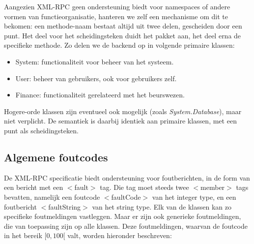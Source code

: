 Aangezien XML-RPC geen ondersteuning biedt voor namespaces of andere vormen van functieorganisatie, hanteren we zelf een mechanisme om dit te bekomen: een methode-naam bestaat altijd uit twee delen, gescheiden door een punt. Het deel voor het scheidingsteken duidt het pakket aan, het deel erna de specifieke methode.
Zo delen we de backend op in volgende primaire klassen:
\begin{itemize}
\item{System: functionaliteit voor beheer van het systeem.}
\item{User: beheer van gebruikers, ook voor gebruikers zelf.}
\item{Finance: functionaliteit gerelateerd met het beurswezen.}
\end{itemize}
Hogere-orde klassen zijn eventueel ook mogelijk (zoals \emph{System.Database}), maar niet verplicht. De semantiek is daarbij identiek aan primaire klassen, met een punt als scheidingsteken.

\subsection{Algemene foutcodes}

De XML-RPC specificatie biedt ondersteuning voor foutberichten, in de form van een bericht met een $<$fault$>$ tag. Die tag moet steeds twee $<$member$>$ tags bevatten, namelijk een foutcode $<$faultCode$>$ van het integer type, en een foutbericht $<$faultString$>$ van het string type. Elk van de klassen kan zo specifieke foutmeldingen vastleggen.
Maar er zijn ook generieke foutmeldingen, die van toepassing zijn op alle klassen. Deze foutmeldingen, waarvan de foutcode in het bereik $[0, 100[$ valt, worden hieronder beschreven:

